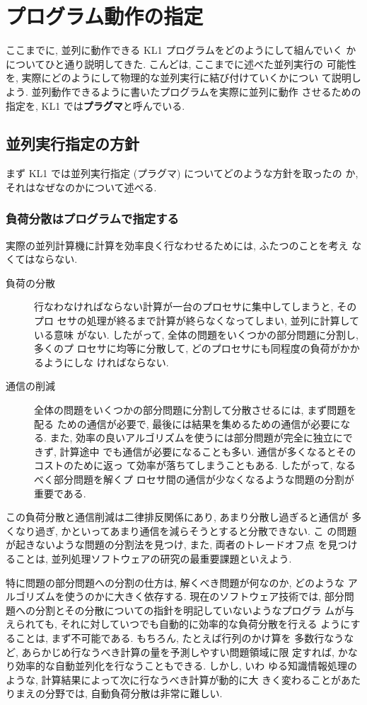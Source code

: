 \documentclass[a4,titlepage]{jsreport}
\def\em{\bf\dg}
\let\dg\bf
\begin{document}
\section{プログラム動作の指定}

ここまでに, 並列に動作できる KL1 プログラムをどのようにして組んでいく
かについてひと通り説明してきた.  こんどは, ここまでに述べた並列実行の
可能性を, 実際にどのようにして物理的な並列実行に結び付けていくかについ
て説明しよう.  並列動作できるように書いたプログラムを実際に並列に動作
させるための指定を, KL1 では{\em プラグマ}と呼んでいる.

\subsection{並列実行指定の方針}
まず KL1 では並列実行指定 (プラグマ) についてどのような方針を取ったの
か, それはなぜなのかについて述べる.

\subsubsection{負荷分散はプログラムで指定する}
実際の並列計算機に計算を効率良く行なわせるためには, ふたつのことを考え
なくてはならない.
\begin{description}
\item[負荷の分散]
行なわなければならない計算が一台のプロセサに集中してしまうと, そのプロ
セサの処理が終るまで計算が終らなくなってしまい, 並列に計算している意味
がない.  したがって, 全体の問題をいくつかの部分問題に分割し, 多くのプ
ロセサに均等に分散して, どのプロセサにも同程度の負荷がかかるようにしな
ければならない.
\item[通信の削減]
全体の問題をいくつかの部分問題に分割して分散させるには, まず問題を配る
ための通信が必要で, 最後には結果を集めるための通信が必要になる.  また, 
効率の良いアルゴリズムを使うには部分問題が完全に独立にできず, 計算途中
でも通信が必要になることも多い.  通信が多くなるとそのコストのために返っ
て効率が落ちてしまうこともある.  したがって, なるべく部分問題を解くプ
ロセサ間の通信が少なくなるような問題の分割が重要である.
\end{description}
この負荷分散と通信削減は二律排反関係にあり, あまり分散し過ぎると通信が
多くなり過ぎ, かといってあまり通信を減らそうとすると分散できない.  こ
の問題が起きないような問題の分割法を見つけ, また, 両者のトレードオフ点
を見つけることは, 並列処理ソフトウェアの研究の最重要課題といえよう.

特に問題の部分問題への分割の仕方は, 解くべき問題が何なのか, どのような
アルゴリズムを使うのかに大きく依存する.  現在のソフトウェア技術では, 
部分問題への分割とその分散についての指針を明記していないようなプログラ
ムが与えられても, それに対していつでも自動的に効率的な負荷分散を行える
ようにすることは, まず不可能である.  もちろん, たとえば行列のかけ算を
多数行なうなど, あらかじめ行なうべき計算の量を予測しやすい問題領域に限
定すれば, かなり効率的な自動並列化を行なうこともできる.  しかし, いわ
ゆる知識情報処理のような, 計算結果によって次に行なうべき計算が動的に大
きく変わることがあたりまえの分野では, 自動負荷分散は非常に難しい.
\end{document}
